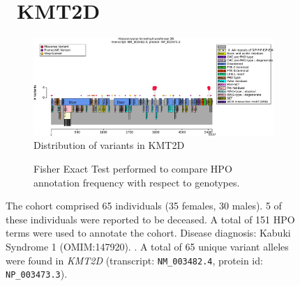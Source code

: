 \begin{figure}[htbp]
\section*{ KMT2D}
\centering
\begin{subfigure}[b]{0.95\textwidth}
\centering
\includegraphics[width=\textwidth]{ img/KMT2D_protein_diagram.pdf} 
\captionsetup{justification=raggedright,singlelinecheck=false}
\caption{Distribution of variants in KMT2D}
\end{subfigure}

\vspace{2em}

\begin{subfigure}[b]{0.95\textwidth}
\centering
{}
\captionsetup{justification=raggedright,singlelinecheck=false}
\caption{Fisher Exact Test performed to compare HPO annotation frequency with respect to genotypes. }
\end{subfigure}

\vspace{2em}

\caption{ The cohort comprised 65 individuals (35 females, 30 males). 5 of these individuals were reported to be deceased. A total of 151 HPO terms were used to annotate the cohort. Disease diagnosis: Kabuki Syndrome 1 (OMIM:147920). . A total of 65 unique variant alleles were found in \textit{KMT2D} (transcript: \texttt{NM\_003482.4}, protein id: \texttt{NP\_003473.3}).}
\end{figure}

